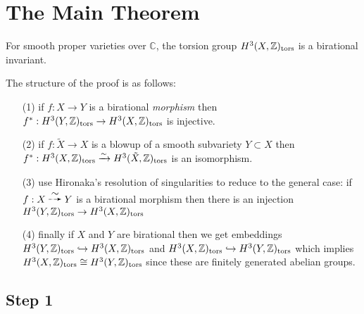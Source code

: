 \documentclass[12pt]{article}
\newcommand{\tors}{\mathrm{tors}}
\begin{document}
\section{The Main Theorem}



\begin{theorem}
For smooth proper varieties over $\mathbb{C}$, the torsion group $H^3(X, \Z)_{\tors}$ is a birational invariant.
\end{theorem}

The structure of the proof is as follows:
\begin{enumerate}
\item[(1)] if $f : X \to Y$ is a birational \textit{morphism} then $f^* : H^3(Y, \Z)_{\tors} \to H^3(X, \Z)_{\tors}$ is injective.
\item[(2)] if $f : \tilde{X} \to X$ is a blowup of a smooth subvariety $Y \subset X$ then $f^* : H^3(X, \Z)_{\tors} \iso H^3(\tilde{X}, \Z)_{\tors}$ is an isomorphism.
\item[(3)] use Hironaka's resolution of singularities to reduce to the general case: if $f : X \birat Y$ is a birational morphism then there is an injection $H^3(Y, \Z)_{\tors} \to H^3(X, \Z)_{\tors}$
\item[(4)] finally if $X$ and $Y$ are birational then we get embeddings $H^3(Y, \Z)_{\tors} \embed H^3(X, \Z)_{\tors}$ and $H^3(X, \Z)_{\tors} \embed H^3(Y, \Z)_{\tors}$ which implies $H^3(X, \Z)_{\tors} \cong H^3(Y, \Z)_{\tors}$ since these are finitely generated abelian groups.
\end{enumerate}

\subsection{Step 1}
\end{document}
